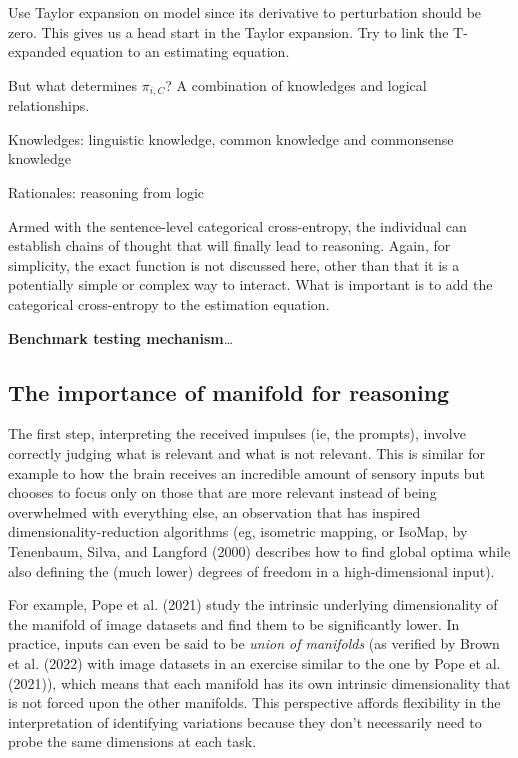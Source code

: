 \documentclass[
]{article}
\begin{document}
Use Taylor expansion on model since its derivative to perturbation
should be zero. This gives us a head start in the Taylor expansion. Try
to link the T-expanded equation to an estimating equation.

But what determines \(\pi_{i, C}\)? A combination of knowledges and
logical relationships.

Knowledges: linguistic knowledge, common knowledge and commonsense
knowledge

Rationales: reasoning from logic

Armed with the sentence-level categorical cross-entropy, the individual
can establish chains of thought that will finally lead to reasoning.
Again, for simplicity, the exact function is not discussed here, other
than that it is a potentially simple or complex way to interact. What is
important is to add the categorical cross-entropy to the estimation
equation.

\textbf{Benchmark testing mechanism}\ldots{}

\hypertarget{the-importance-of-manifold-for-reasoning}{%
\subsection{The importance of manifold for
reasoning}\label{the-importance-of-manifold-for-reasoning}}

The first step, interpreting the received impulses (ie, the prompts),
involve correctly judging what is relevant and what is not relevant.
This is similar for example to how the brain receives an incredible
amount of sensory inputs but chooses to focus only on those that are
more relevant instead of being overwhelmed with everything else, an
observation that has inspired dimensionality-reduction algorithms (eg,
isometric mapping, or IsoMap, by Tenenbaum, Silva, and Langford (2000)
describes how to find global optima while also defining the (much lower)
degrees of freedom in a high-dimensional input).

For example, Pope et al. (2021) study the intrinsic underlying
dimensionality of the manifold of image datasets and find them to be
significantly lower. In practice, inputs can even be said to be
\emph{union of manifolds} (as verified by Brown et al. (2022) with image
datasets in an exercise similar to the one by Pope et al. (2021)), which
means that each manifold has its own intrinsic dimensionality that is
not forced upon the other manifolds. This perspective affords
flexibility in the interpretation of identifying variations because they
don't necessarily need to probe the same dimensions at each task.
\end{document}
